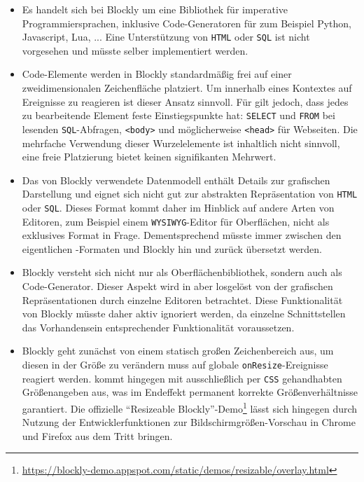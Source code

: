 \begin{itemize}[noitemsep]
\item Es handelt sich bei Blockly um eine Bibliothek für imperative Programmiersprachen, inklusive Code-Generatoren für zum Beispiel Python, Javascript, Lua, ... Eine Unterstützung von \texttt{HTML} oder \texttt{SQL} ist nicht vorgesehen und müsste selber implementiert werden.
  
\item Code-Elemente werden in Blockly standardmäßig frei auf einer zweidimensionalen Zeichenfläche platziert. Um innerhalb eines Kontextes auf Ereignisse zu reagieren ist dieser Ansatz sinnvoll. Für \idename{} gilt jedoch, dass jedes zu bearbeitende Element feste Einstiegspunkte hat: \texttt{SELECT} und \texttt{FROM} bei lesenden \texttt{SQL}-Abfragen, \texttt{<body>} und möglicherweise \texttt{<head>} für Webseiten. Die mehrfache Verwendung dieser Wurzelelemente ist inhaltlich nicht sinnvoll, eine freie Platzierung bietet keinen signifikanten Mehrwert.

\item Das von Blockly verwendete Datenmodell enthält Details zur grafischen Darstellung und eignet sich nicht gut zur abstrakten Repräsentation von \texttt{HTML} oder \texttt{SQL}. Dieses Format kommt daher im Hinblick auf andere Arten von Editoren, zum Beispiel einem \texttt{WYSIWYG}-Editor für Oberflächen, nicht als exklusives Format in Frage. Dementsprechend müsste immer zwischen den eigentlichen \idename{}-Formaten und Blockly hin und zurück übersetzt werden.
  
\item Blockly versteht sich nicht nur als Oberflächenbibliothek, sondern auch als Code-Generator. Dieser Aspekt wird in \idename{} aber losgelöst von der grafischen Repräsentationen durch einzelne Editoren betrachtet. Diese Funktionalität von Blockly müsste daher aktiv ignoriert werden, da einzelne Schnittstellen das Vorhandensein entsprechender Funktionalität voraussetzen.
  
\item Blockly geht zunächst von einem statisch großen Zeichenbereich aus, um diesen in der Größe zu verändern muss auf globale \texttt{onResize}-Ereignisse reagiert werden. \idename{} kommt hingegen mit ausschließlich per \texttt{CSS} gehandhabten Größenangeben aus, was im Endeffekt permanent korrekte Größenverhältnisse garantiert. Die offizielle "`Resizeable Blockly"'-Demo\footnote{\url{https://blockly-demo.appspot.com/static/demos/resizable/overlay.html}} lässt sich hingegen durch Nutzung der Entwicklerfunktionen zur Bildschirmgrößen-Vorschau in Chrome und Firefox aus dem Tritt bringen.
\end{itemize}

